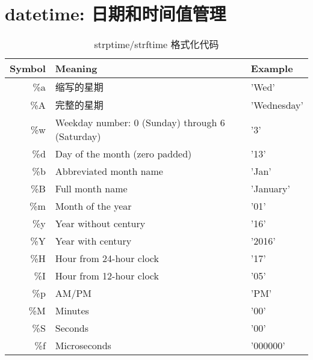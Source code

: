 \section{datetime: 日期和时间值管理}
\begin{table}
    \caption{strptime/strftime 格式化代码}
    \centering
    \begin{tabular}{rll}
        \hline
        Symbol & Meaning                                             & Example                    \\
        \hline
        \%a    & 缩写的星期                                               & 'Wed'                      \\
        \%A    & 完整的星期                                               & 'Wednesday'                \\
        \%w    & Weekday number: 0 (Sunday) through 6 (Saturday)     & '3'                        \\
        \%d    & Day of the month (zero padded)                      & '13'                       \\
        \%b    & Abbreviated month name                              & 'Jan'                      \\
        \%B    & Full month name                                     & 'January'                  \\
        \%m    & Month of the year                                   & '01'                       \\
        \%y    & Year without century                                & '16'                       \\
        \%Y    & Year with century                                   & '2016'                     \\
        \%H    & Hour from 24-hour clock                             & '17'                       \\
        \%I    & Hour from 12-hour clock                             & '05'                       \\
        \%p    & AM/PM                                               & 'PM'                       \\
        \%M    & Minutes                                             & '00'                       \\
        \%S    & Seconds                                             & '00'                       \\
        \%f    & Microseconds                                        & '000000'                   \\

\end{tabular}
\end{table}
